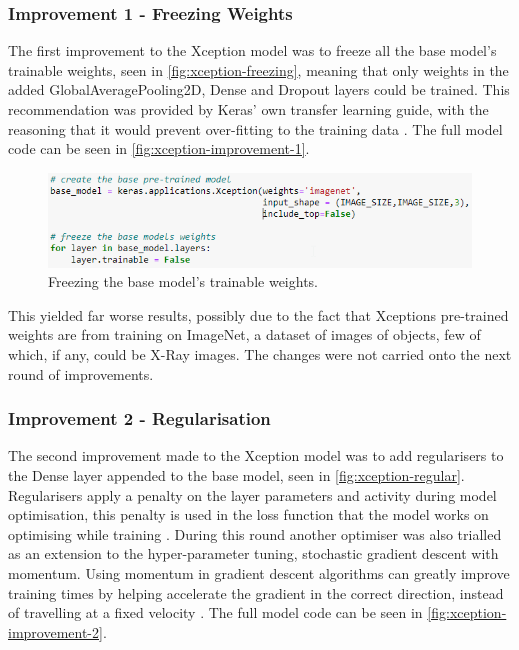 \subsubsection{Improvement 1 - Freezing Weights}
The first improvement to the Xception model was to freeze all the base model's trainable weights, seen in \autoref{fig:xception-freezing}, meaning that only weights in the added GlobalAveragePooling2D, Dense and Dropout layers could be trained. This recommendation was provided by Keras' own transfer learning guide, with the reasoning that it would prevent over-fitting to the training data \citep{Transfer59:online}. The full model code can be seen in \autoref{fig:xception-improvement-1}.

\begin{figure}[H]
    \centering
    \includegraphics[width=\textwidth]{figures/xception-freezing.png}
    \caption{Freezing the base model's trainable weights.}
    \label{fig:xception-freezing}
\end{figure}

This yielded far worse results, possibly due to the fact that Xceptions pre-trained weights are from training on ImageNet, a dataset of images of objects, few of which, if any, could be X-Ray images. The changes were not carried onto the next round of improvements.

\subsubsection{Improvement 2 - Regularisation}
The second improvement made to the Xception model was to add regularisers to the Dense layer appended to the base model, seen in \autoref{fig:xception-regular}. Regularisers apply a penalty on the layer parameters and activity during model optimisation, this penalty is used in the loss function that the model works on optimising while training \citep{Layerwei14:online}. During this round another optimiser was also trialled as an extension to the hyper-parameter tuning, stochastic gradient descent with momentum. Using momentum in gradient descent algorithms can greatly improve training times by helping accelerate the gradient in the correct direction, instead of travelling at a fixed velocity \citep{qian1999momentum}. The full model code can be seen in \autoref{fig:xception-improvement-2}.

